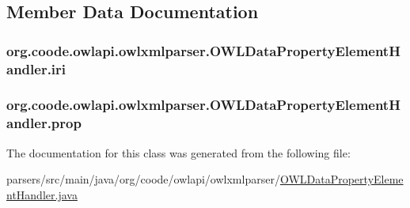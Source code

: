 \subsection{Member Data Documentation}
\hypertarget{classorg_1_1coode_1_1owlapi_1_1owlxmlparser_1_1_o_w_l_data_property_element_handler_ae4782acd363b05cd78daa64650312c08}{
\subsubsection[{iri}]{ org.\-coode.\-owlapi.\-owlxmlparser.\-O\-W\-L\-Data\-Property\-Element\-Handler.\-iri\hspace{0.3cm}{\ttfamily [private]}}}\label{classorg_1_1coode_1_1owlapi_1_1owlxmlparser_1_1_o_w_l_data_property_element_handler_ae4782acd363b05cd78daa64650312c08}
\hypertarget{classorg_1_1coode_1_1owlapi_1_1owlxmlparser_1_1_o_w_l_data_property_element_handler_a8addfc9b1ba1e3fbdaef6d781ef6ab11}{
\subsubsection[{prop}]{ org.\-coode.\-owlapi.\-owlxmlparser.\-O\-W\-L\-Data\-Property\-Element\-Handler.\-prop\hspace{0.3cm}{\ttfamily [private]}}}\label{classorg_1_1coode_1_1owlapi_1_1owlxmlparser_1_1_o_w_l_data_property_element_handler_a8addfc9b1ba1e3fbdaef6d781ef6ab11}


The documentation for this class was generated from the following file\-:\begin{DoxyCompactItemize}
\item 
parsers/src/main/java/org/coode/owlapi/owlxmlparser/\hyperlink{_o_w_l_data_property_element_handler_8java}{O\-W\-L\-Data\-Property\-Element\-Handler.\-java}\end{DoxyCompactItemize}
